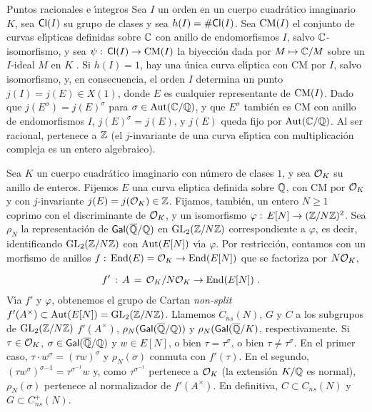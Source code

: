\begin{subsection}{Puntos racionales e \'{\i}ntegros}
 Sea $I$ un orden en un cuerpo cuadr\'{a}tico imaginario $K$, sea $\Cl(I)$ su
 grupo de clases y sea $h(I)=\#\Cl(I)$. Sea $\rm{CM}(I)$ el conjunto de curvas
 el\'{\i}pticas definidas sobre $\bb{C}$ con anillo de endomorfismos $I$,
 salvo $\bb{C}$-isomorfismo, y sea $\psi:\,\Cl(I)\rightarrow\rm{CM}(I)$ la
 biyecci\'{o}n dada por $M\mapsto\bb{C}/M$ sobre un $I$-ideal $M$ en $K$
 \cite{cox}.
%
 Si $h(I)=1$, hay una \'{u}nica curva el\'{\i}ptica con CM por $I$, salvo
 isomorfismo, y, en consecuencia, el orden $I$ determina un punto
 $j(I)=j(E)\in X(1)$, donde $E$ es cualquier representante de $\rm{CM}(I)$.
 Dado que $j(E^{\sigma})=j(E)^{\sigma}$ para $\sigma\in\rm{Aut}(\bb{C}/\bb{Q})$,
 y que $E^{\sigma}$ tambi\'{e}n es CM con anillo de endomorfismos $I$,
 $j(E)^{\sigma}=j(E)$, y $j(E)$ queda fijo por $\rm{Aut}(\bb{C}/\bb{Q})$. Al ser
 racional, pertenece a $\bb{Z}$ (el $j$-invariante de una curva el\'{\i}ptica
 con multiplicaci\'{o}n compleja es un entero algebraico).

 Sea $K$ un cuerpo cuadr\'{a}tico imaginario con n\'{u}mero de clases $1$, y sea
 $\cal{O}_{K}$ su anillo de enteros. Fijemos $E$ una curva el\'{\i}ptica definida
 sobre $\bb{Q}$, con CM por $\cal{O}_{K}$ y con $j$-invariante
 $j(E)=j(\cal{O}_{K})\in\bb{Z}$. Fijamos, tambi\'{e}n, un entero $N\geq1$ coprimo
 con el discriminante de $\cal{O}_{K}$, y un isomorfismo
 $\varphi:\,E[N]\rightarrow(\bb{Z}/N\bb{Z})^{2}$. Sea $\rho_{N}$ la
 representaci\'{o}n de $\absGal{\bb{Q}}$ en $\GL{2}(\bb{Z}/N\bb{Z})$
 correspondiente a $\varphi$, es decir, identificando $\GL{2}(\bb{Z}/N\bb{Z})$
 con $\rm{Aut}(E[N])$ v\'{\i}a $\varphi$. Por restricci\'{o}n, contamos con un
 morfismo de anillos
 $f:\,\rm{End}(E)=\cal{O}_{K}\rightarrow\rm{End}(E[N])$ que se factoriza por
 $N\cal{O}_{K}$,

 \begin{align*}
  f' & \,:\,A\,=\,\cal{O}_{K}/N\cal{O}_{K}\rightarrow\rm{End}(E[N])\text{ .}
 \end{align*}
V\'{\i}a $f'$ y $\varphi$, obtenemos el grupo de Cartan \textit{non-split}
$f'(A^{\times})\subset\rm{Aut}(E[N])=\GL{2}(\bb{Z}/N\bb{Z})$. Llamemos
$C_{ns}(N)$, $G$ y $C$ a los subgrupos de $\GL{2}(\bb{Z}/N\bb{Z})$
$f'(A^{\times})$, $\rho_{N}(\absGal{\bb{Q}})$ y
$\rho_{N}(\Gal(\overline{\bb{Q}}/K)$, respectivamente. Si $\tau\in\cal{O}_{K}$,
$\sigma\in\absGal{\bb{Q}}$ y $w\in E[N]$, o bien $\tau=\tau^{\sigma}$, o bien
$\tau\not =\tau^{\sigma}$. En el primer caso,
$\tau\cdot w^{\sigma}=(\tau w)^{\sigma}$ y $\rho_{N}(\sigma)$ conmuta con
$f'(\tau)$. En el segundo, $(\tau w^{\sigma})^{\sigma{-1}}=\tau^{\sigma^{-1}}w$
y, como $\tau^{\sigma^{-1}}$ pertenece a $\cal{O}_{K}$ (la extensi\'{o}n
$K/\bb{Q}$ es normal), $\rho_{N}(\sigma)$ pertenece al normalizador de
$f'(A^{\times})$. En definitiva, $C\subset C_{ns}(N)$ y
$G\subset C_{ns}^{+}(N)$.


\end{subsection}
